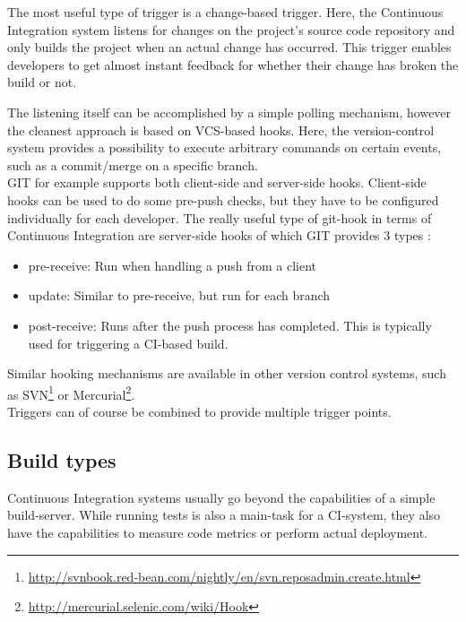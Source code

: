 The most useful type of trigger is a change-based trigger. Here, the Continuous
Integration system listens for changes on the project's source code repository
and only builds the project when an actual change has occurred. This trigger
enables developers to get almost instant feedback for whether their change has
broken the build or not.

The listening itself can be accomplished by a simple polling mechanism, however
the cleanest approach is based on VCS-based hooks. Here, the version-control
system provides a possibility to execute arbitrary commands on certain events,
such as a commit/merge on a specific branch.\\

GIT for example supports both client-side and server-side hooks. Client-side
hooks can be used to do some pre-push checks, but they have to be configured
individually for each developer. The really useful type of git-hook in terms of
Continuous Integration are server-side hooks of which GIT provides 3 types
\cite{chacon:2009}:

\begin{itemize}
    \item pre-receive: Run when handling a push from a client
    \item update: Similar to pre-receive, but run for each branch
    \item post-receive: Runs after the push process has completed. This is
        typically used for triggering a CI-based build.
\end{itemize}

Similar hooking mechanisms are available in other version control systems, such
as
SVN\footnote{\url{http://svnbook.red-bean.com/nightly/en/svn.reposadmin.create.html}}
or Mercurial\footnote{\url{http://mercurial.selenic.com/wiki/Hook}}.\\

Triggers can of course be combined to provide multiple trigger points.

\subsection{Build types}\label{sec:build-types}

Continuous Integration systems usually go beyond the capabilities of a simple
build-server. While running tests is also a main-task for a CI-system, they also
have the capabilities to measure code metrics or perform actual deployment.

